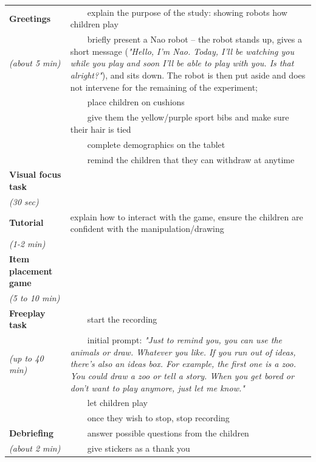 \documentclass{article}
\begin{document}
\newcommand{\tabitem}{~~\llap{\textbullet}~~}
    \begin{tabular}{@{}p{0.2\linewidth}p{0.8\linewidth}@{}}
\toprule
\bf Greetings                     & \tabitem explain the purpose of the study: showing robots how children play  \\
\emph{(about 5 min)}              & \tabitem briefly present a Nao robot -- the robot stands up, gives a short
                                    message (\emph{"Hello, I'm Nao. Today, I'll be watching you while you
                                    play and soon I'll be able to play with you. Is that alright?"}), and
                                    sits down. The robot is then put aside and does not intervene
                                    for the remaining of the experiment; \\
                                  & \tabitem place children on cushions  \\ 
                                  & \tabitem give them the yellow/purple sport
                                  bibs and make sure their hair is tied \\ 
                                  & \tabitem complete demographics on the tablet \\
                                  & \tabitem remind the children that they can withdraw at anytime \\ \midrule
\bf Visual focus task             &  \\ 
\emph{(30 sec)}                   &  \\ \midrule
\bf Tutorial                      & explain how to interact with the game, ensure the children are confident with the manipulation/drawing \\ 
\emph{(1-2 min)}                  &  \\ \midrule
\bf Item placement game           &  \\
\emph{(5 to 10 min)}              &  \\ \midrule
\bf Freeplay task                 & \tabitem start the recording \\
\emph{(up to 40 min)}             & \tabitem initial prompt: \emph{"Just to remind you, you can use the animals or draw. Whatever you
                                  like. If you run out of ideas, there's also an ideas box. For example, the first one is a
                                  zoo. You could draw a zoo or tell a story. When you get bored or don't want to play
                                  anymore, just let me know."} \\
                                  & \tabitem let children play \\
                                  & \tabitem once they wish to stop, stop recording \\ \midrule
\bf Debriefing                    &  \tabitem answer possible questions from the children \\
\emph{(about 2 min)}              & \tabitem give stickers as a thank you \\ \bottomrule
\end{tabular}
\end{document}
